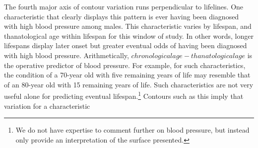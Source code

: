 \documentclass[11pt,oneside]{article} %
\begin{document}
The fourth major axis of contour variation runs perpendicular to lifelines. One
characteristic that clearly displays this pattern is ever having been
diagnosed with high blood pressure among males. This characteristic varies by
lifespan, and thanatological age within lifespan for this window of study.
In other words, longer lifespans display later onset but greater eventual odds of
having been diagnosed with high blood pressure. Arithmetically, $chronological
age - thanatological age$ is the operative predictor of blood pressure. For
example, for such characteristics, the condition of a 70-year old with five
remaining years of life may resemble that of an 80-year old with
15 remaining years of life. Such characteristics are not very useful alone for predicting eventual
lifespan.\footnote{We do not have expertise to comment further on blood pressure, but instead only provide an interpretation of the surface presented.} Contours such as this imply that variation for a characteristic
\end{document}
